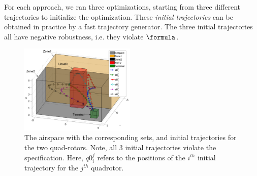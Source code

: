For each approach, we ran three optimizations, starting from three different trajectories to initialize the optimization. These \textit{initial trajectories} can be obtained in practice by a fast trajectory generator. 
The three initial trajectories all have negative robustness, i.e. they violate $\formula$.
\begin{figure}[t]
\centering
\includegraphics[width=0.49\textwidth]{figures/QuadInitTrajs_scissored}
\caption{The airspace with the corresponding sets, and initial trajectories for the two quad-rotors. Note, all 3 initial trajectories violate the specification. Here, $q0_{i}^j$ refers to the positions of the $i^{th}$ initial trajectory for the $j^{th}$ quadrotor.} 
\label{fig:quad_init}
\end{figure}

